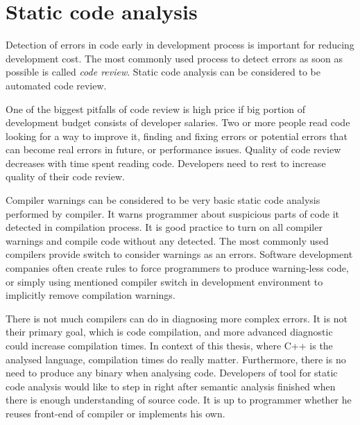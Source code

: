 \chapter{Static code analysis}
Detection of errors in code early in development process is important for reducing development cost. The most commonly used process to detect errors as soon as possible is called \emph{code review}. Static code analysis can be considered to be automated code review.

One of the biggest pitfalls of code review is high price if big portion of development budget consists of developer salaries. Two or more people read code looking for a way to improve it, finding and fixing errors or potential errors that can become real errors in future, or performance issues. Quality of code review decreases with time spent reading code. Developers need to rest to increase quality of their code review.

Compiler warnings can be considered to be very basic static code analysis performed by compiler. It warns programmer about suspicious parts of code it detected in compilation process. It is good practice to turn on all compiler warnings and compile code without any detected. The most commonly used compilers provide switch to consider warnings as an errors. Software development companies often create rules to force programmers to produce warning-less code, or simply using mentioned compiler switch in development environment to implicitly remove compilation warnings.

There is not much compilers can do in diagnosing more complex errors. It is not their primary goal, which is code compilation, and more advanced diagnostic could increase compilation times. In context of this thesis, where C++  is the analysed language, compilation times do really matter. Furthermore, there is no need to produce any binary when analysing code. Developers of tool for static code analysis would like to step in right after semantic analysis finished when there is enough understanding of source code. It is up to programmer whether he reuses front-end of compiler or implements his own.

